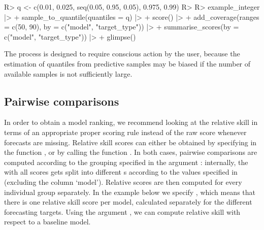 \documentclass[
]{jss}
\begin{document}
\begin{CodeChunk}
\begin{CodeInput}
R> q <- c(0.01, 0.025, seq(0.05, 0.95, 0.05), 0.975, 0.99)
R> 
R> example_integer |>
+   sample_to_quantile(quantiles = q) |>
+   score() |>
+   add_coverage(ranges = c(50, 90), by = c("model", "target_type")) |>
+   summarise_scores(by = c("model", "target_type")) |>
+   glimpse()
\end{CodeInput}
\end{CodeChunk}

The process is designed to require conscious action by the user, because
the estimation of quantiles from predictive samples may be biased if the
number of available samples is not sufficiently large.

\hypertarget{pairwisecode}{%
\subsection{Pairwise comparisons}\label{pairwisecode}}

In order to obtain a model ranking, we recommend looking at the relative
skill in terms of an appropriate proper scoring rule instead of the raw
score whenever forecasts are missing. Relative skill scores can either
be obtained by specifying  in the function
, or by calling the function
. In both cases, pairwise comparisons are
computed according to the grouping specified in the argument :
internally, the  with all scores gets split into
different s according to the values specified in
 (excluding the column `model'). Relative scores are then
computed for every individual group separately. In the example below we
specify , which means that there is
one relative skill score per model, calculated separately for the
different forecasting targets. Using the argument , we
can compute relative skill with respect to a baseline model.
\end{document}
